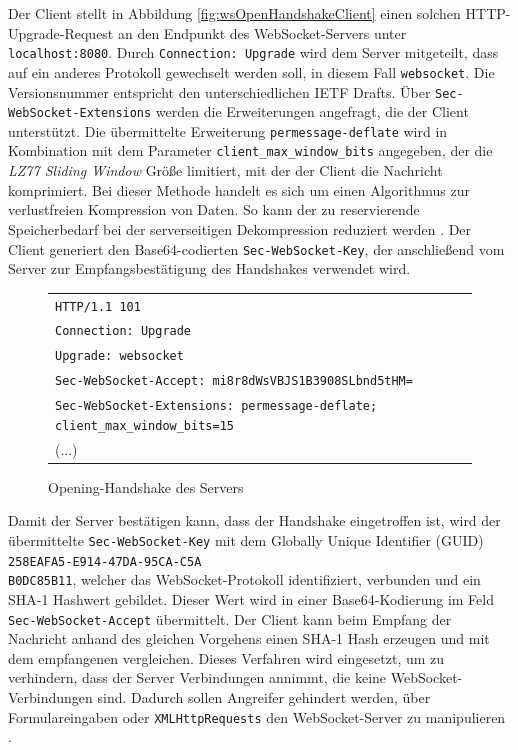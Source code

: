 \documentclass[11pt,a4paper,titlepage]{scrartcl}
\numberwithin{equation}{section}
\begin{document}
\noindent Der Client stellt in Abbildung \ref{fig:wsOpenHandshakeClient} einen solchen HTTP-Upgrade-Request an den Endpunkt des WebSocket-Servers unter \texttt{localhost:8080}. Durch \texttt{Connection: Upgrade} wird dem Server mitgeteilt, dass auf ein anderes Protokoll gewechselt werden soll, in diesem Fall \texttt{websocket}. Die Versionsnummer entspricht den unterschiedlichen IETF Drafts. Über \texttt{Sec-WebSocket-Extensions} werden die Erweiterungen angefragt, die der Client unterstützt. Die übermittelte Erweiterung \texttt{permessage-deflate} wird in Kombination mit dem Parameter \texttt{client\_max\_window\_bits} angegeben, der die \textit{LZ77 Sliding Window} Größe limitiert, mit der der Client die Nachricht komprimiert. Bei dieser Methode handelt es sich um einen Algorithmus zur verlustfreien Kompression von Daten. So kann der zu reservierende Speicherbedarf bei der serverseitigen Dekompression reduziert werden \autocite[18]{yoshino_compression_2015}. Der Client generiert den Base64-codierten \texttt{Sec-WebSocket-Key}, der anschließend vom Server zur Empfangsbestätigung des Handshakes verwendet wird. 

\begin{figure}[ht]
	\begin{center}
		\begin{tabular}{l}
			\texttt{HTTP/1.1 101} \\
			\texttt{Connection: Upgrade} \\
			\texttt{Upgrade: websocket} \\
			\texttt{Sec-WebSocket-Accept: mi8r8dWsVBJS1B3908SLbnd5tHM=}\\
			\texttt{Sec-WebSocket-Extensions: permessage-deflate; client\_max\_window\_bits=15}\\
			(...)\vspace{-5mm}
		\end{tabular}
	\end{center}
	\caption{Opening-Handshake des Servers}
	\label{fig:wsOpenHandshakeServer}
\end{figure}

\noindent Damit der Server bestätigen kann, dass der Handshake eingetroffen ist, wird der  übermittelte \texttt{Sec-WebSocket-Key} mit dem Globally Unique Identifier (GUID) \texttt{258EAFA5-E914-47DA-95CA-C5A\\B0DC85B11}, welcher das WebSocket-Protokoll identifiziert, verbunden und ein SHA-1 Hashwert gebildet. Dieser Wert wird in einer Base64-Kodierung im Feld \texttt{Sec-WebSocket-Accept} übermittelt. Der Client kann beim Empfang der Nachricht anhand des gleichen Vorgehens einen SHA-1 Hash erzeugen und mit dem empfangenen vergleichen. Dieses Verfahren wird eingesetzt, um zu verhindern, dass der Server Verbindungen annimmt, die keine WebSocket-Verbindungen sind. Dadurch sollen Angreifer gehindert werden, über Formulareingaben oder \texttt{XMLHttpRequests} den WebSocket-Server zu manipulieren \autocite[7]{fette_websocket_2011}.
\end{document}
